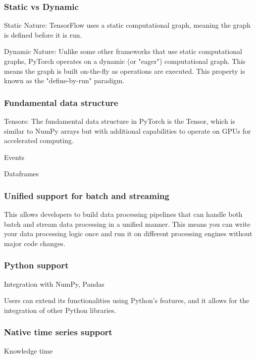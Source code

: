 \documentclass[11pt, reqno]{amsart}
\theoremstyle{definition}
\theoremstyle{remark}
\begin{document}
  \subsubsection{Static vs Dynamic}
  Static Nature: TensorFlow uses a static computational graph, meaning the graph
  is defined before it is run.

  Dynamic Nature: Unlike some other frameworks that use static computational
  graphs, PyTorch operates on a dynamic (or "eager") computational graph. This
  means the graph is built on-the-fly as operations are executed. This property is
  known as the "define-by-run" paradigm.

  \subsubsection{Fundamental data structure}
  Tensors: The fundamental data structure in PyTorch is the Tensor, which is similar
  to NumPy arrays but with additional capabilities to operate on GPUs for accelerated
  computing.

  Events

  Dataframes

  \subsubsection{Unified support for batch and streaming}
  This allows developers to build data processing pipelines that can handle both
  batch and stream data processing in a unified manner. This means you can write
  your data processing logic once and run it on different processing engines
  without major code changes.

  \subsubsection{Python support}
  Integration with NumPy, Pandas

  Users can extend its functionalities using Python’s features, and it allows for
  the integration of other Python libraries.

  \subsubsection{Native time series support}
  Knowledge time
\end{document}
